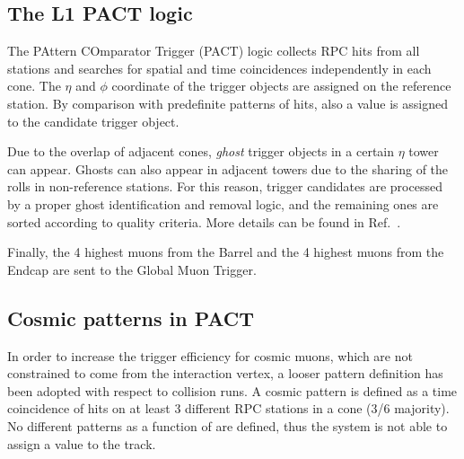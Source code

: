 \subsection{The L1 PACT logic}
The PAttern COmparator Trigger (PACT) logic 
collects RPC hits from all stations and searches for
spatial and time coincidences independently
in each cone. The $\eta$ and $\phi$ coordinate of the trigger
objects are assigned on the reference station.
By comparison with predefinite patterns of hits, 
also a \pt value is assigned to the candidate trigger 
object. 

Due to the overlap of adjacent cones, 
{\em ghost} trigger objects in a certain $\eta$ tower 
can appear. Ghosts can also appear in adjacent towers 
due to the sharing of the rolls in non-reference stations. 
For this reason, trigger candidates are processed by a proper 
ghost identification and removal logic,
and the remaining ones are sorted according to quality criteria.
More details can be found in Ref.~\cite{ref:trig_tdr}.

Finally, the 4 highest \pt muons
from the Barrel and the 4 highest \pt muons from the
Endcap are sent to the Global Muon Trigger.
%

\subsection{Cosmic patterns in PACT}
In order to increase the trigger efficiency for 
cosmic muons, which are not constrained
to come from the interaction vertex, 
a looser pattern definition has been 
adopted with respect to collision runs.
A cosmic pattern is defined as a 
time coincidence of hits on at least
3 different RPC stations in a cone (3/6 majority).
No different patterns as a function 
of \pt are defined, thus the system is
not able to assign a \pt value 
to the track.


